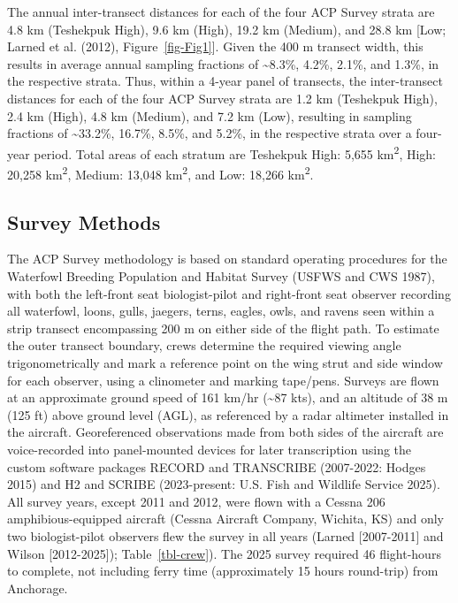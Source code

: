 \documentclass[
]{article}
\begin{document}
The annual inter-transect distances for each of the four ACP Survey
strata are 4.8 km (Teshekpuk High), 9.6 km (High), 19.2 km (Medium), and
28.8 km {[}Low; Larned et al. (2012), Figure~\ref{fig-Fig1}{]}. Given
the 400 m transect width, this results in average annual sampling
fractions of \textasciitilde8.3\%, 4.2\%, 2.1\%, and 1.3\%, in the
respective strata. Thus, within a 4-year panel of transects, the
inter-transect distances for each of the four ACP Survey strata are 1.2
km (Teshekpuk High), 2.4 km (High), 4.8 km (Medium), and 7.2 km (Low),
resulting in sampling fractions of \textasciitilde33.2\%, 16.7\%, 8.5\%,
and 5.2\%, in the respective strata over a four-year period. Total areas
of each stratum are Teshekpuk High: 5,655 km\textsuperscript{2}, High:
20,258 km\textsuperscript{2}, Medium: 13,048 km\textsuperscript{2}, and
Low: 18,266 km\textsuperscript{2}.

\subsection*{Survey Methods}\label{survey-methods}

The ACP Survey methodology is based on standard operating procedures for
the Waterfowl Breeding Population and Habitat Survey (USFWS and CWS
1987), with both the left-front seat biologist-pilot and right-front
seat observer recording all waterfowl, loons, gulls, jaegers, terns,
eagles, owls, and ravens seen within a strip transect encompassing 200 m
on either side of the flight path. To estimate the outer transect
boundary, crews determine the required viewing angle trigonometrically
and mark a reference point on the wing strut and side window for each
observer, using a clinometer and marking tape/pens. Surveys are flown at
an approximate ground speed of 161 km/hr (\textasciitilde87 kts), and an
altitude of 38 m (125 ft) above ground level (AGL), as referenced by a
radar altimeter installed in the aircraft. Georeferenced observations
made from both sides of the aircraft are voice-recorded into
panel-mounted devices for later transcription using the custom software
packages RECORD and TRANSCRIBE (2007-2022: Hodges 2015) and H2 and
SCRIBE (2023-present: U.S. Fish and Wildlife Service 2025). All survey
years, except 2011 and 2012, were flown with a Cessna 206
amphibious-equipped aircraft (Cessna Aircraft Company, Wichita, KS) and
only two biologist-pilot observers flew the survey in all years (Larned
{[}2007-2011{]} and Wilson {[}2012-2025{]}); Table~\ref{tbl-crew}). The
2025 survey required 46 flight-hours to complete, not including ferry
time (approximately 15 hours round-trip) from Anchorage.
\end{document}
